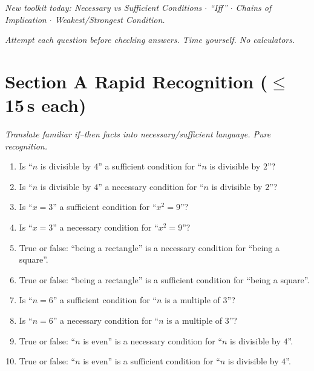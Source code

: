 \documentclass[11pt,a4paper]{article}
\begin{document}
\noindent\textit{New toolkit today: Necessary vs Sufficient Conditions $\cdot$ ``Iff'' $\cdot$ Chains of Implication $\cdot$ Weakest/Strongest Condition.}

\vspace{2pt}
\noindent\textit{Attempt each question before checking answers. Time yourself. No calculators.}

\section*{Section A \quad Rapid Recognition \hfill{\normalfont\small($\leq$15\,s each)}}

\noindent\textit{Translate familiar if--then facts into necessary/sufficient language. Pure recognition.}

\begin{enumerate}

\item Is ``$n$ is divisible by $4$'' a sufficient condition for ``$n$ is divisible by $2$''?

\item Is ``$n$ is divisible by $4$'' a necessary condition for ``$n$ is divisible by $2$''?

\item Is ``$x=3$'' a sufficient condition for ``$x^2=9$''?

\item Is ``$x=3$'' a necessary condition for ``$x^2=9$''?

\item True or false: ``being a rectangle'' is a necessary condition for ``being a square''.

\item True or false: ``being a rectangle'' is a sufficient condition for ``being a square''.

\item Is ``$n=6$'' a sufficient condition for ``$n$ is a multiple of $3$''?

\item Is ``$n=6$'' a necessary condition for ``$n$ is a multiple of $3$''?

\item True or false: ``$n$ is even'' is a necessary condition for ``$n$ is divisible by $4$''.

\item True or false: ``$n$ is even'' is a sufficient condition for ``$n$ is divisible by $4$''.

\end{enumerate}
\end{document}
